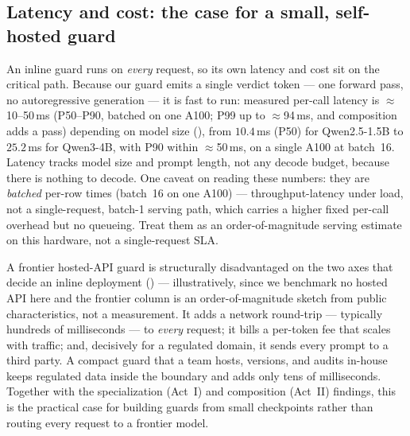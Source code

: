 \documentclass[11pt]{article}
\begin{document}
\subsection{Latency and cost: the case for a small, self-hosted guard}
\label{sec:practitioner-cost}
An inline guard runs on \emph{every} request, so its own latency and cost sit on the critical path.
Because our guard emits a single verdict token --- one forward pass, no autoregressive generation --- it
is fast to run: measured per-call latency is $\approx$10--50\,ms (P50--P90, batched on one A100; P99 up to $\approx$94\,ms, and composition adds a pass) depending on model size
(), from $10.4$\,ms (P50) for Qwen2.5-1.5B to $25.2$\,ms for Qwen3-4B, with P90 within
$\approx$50\,ms, on a single A100 at batch~16. Latency tracks model size and prompt length, not any decode
budget, because there is nothing to decode. One caveat on reading these numbers: they are \emph{batched}
per-row times (batch~16 on one A100) --- throughput-latency under load, not a single-request, batch-1
serving path, which carries a higher fixed per-call overhead but no queueing. Treat them as an
order-of-magnitude serving estimate on this hardware, not a single-request SLA.



A frontier hosted-API guard is structurally disadvantaged on the two axes that decide an inline deployment
() --- illustratively, since we benchmark no hosted API here and the frontier column
is an order-of-magnitude sketch from public characteristics, not a measurement. It adds a network
round-trip --- typically hundreds of milliseconds --- to \emph{every} request; it bills a per-token fee
that scales with traffic; and, decisively for a regulated domain, it sends every prompt to a third party. A compact guard that a team hosts, versions, and audits
in-house keeps regulated data inside the boundary and adds only tens of milliseconds. Together with the
specialization (Act~I) and composition (Act~II) findings, this is the practical case for building guards
from small checkpoints rather than routing every request to a frontier model.
\end{document}
